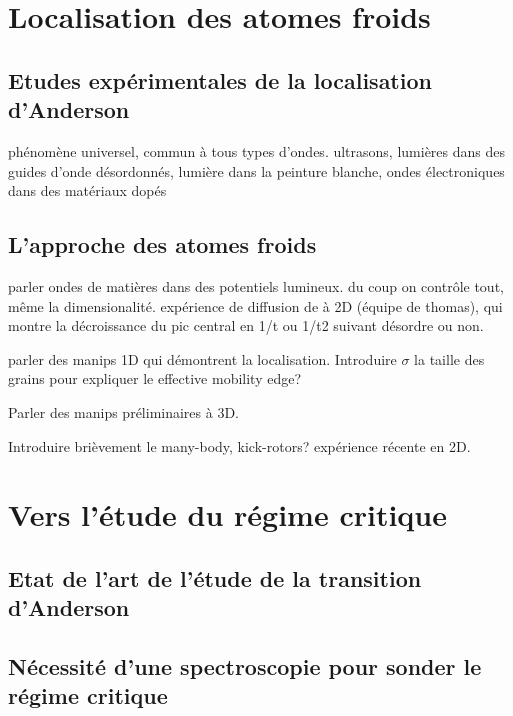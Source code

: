 \section{Localisation des atomes froids}
\subsection{Etudes expérimentales de la localisation d'Anderson}
phénomène universel, commun à tous types d'ondes.
ultrasons, lumières dans des guides d'onde désordonnés, lumière dans la peinture blanche, ondes électroniques dans des matériaux dopés


\subsection{L'approche des atomes froids}
parler ondes de matières dans des potentiels lumineux. du coup on contrôle tout, même la dimensionalité. 
expérience de diffusion de à 2D (équipe de thomas), qui montre la décroissance du  pic central en 1/t ou 1/t2 suivant désordre ou non.

parler des manips 1D qui démontrent la localisation. Introduire $\sigma$ la taille des grains pour expliquer le effective mobility edge?

Parler des manips préliminaires à 3D. 

Introduire brièvement le many-body, kick-rotors?
expérience récente en 2D.

\section{Vers l'étude du régime critique}
\subsection{Etat de l'art de l'étude de la transition d'Anderson}
\lipsum[6]
\subsection{Nécessité d'une spectroscopie pour sonder le régime critique}
\lipsum[7]







